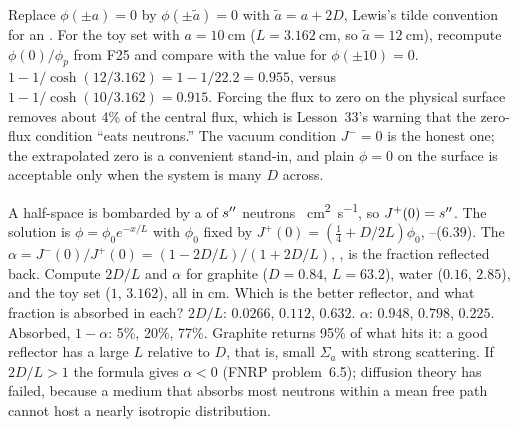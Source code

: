 \documentclass[compact]{ne630handout}
\begin{document}
\begin{programmed}
\begin{pframe}
Replace $\phi(\pm a)=0$ by $\phi(\pm\tilde a)=0$ with $\tilde a=a+2D$, Lewis's tilde convention for an . For the toy set with $a=\SI{10}{\centi\meter}$ ($L=\SI{3.162}{\centi\meter}$, so $\tilde a=\SI{12}{\centi\meter}$), recompute $\phi(0)/\phi_p$ from F25 and compare with the value for $\phi(\pm10)=0$.
\response
$1-1/\cosh(12/3.162)=1-1/22.2=0.955$, versus $1-1/\cosh(10/3.162)=0.915$. Forcing the flux to zero on the physical surface removes about 4\% of the central flux, which is Lesson~33's warning that the zero-flux condition ``eats neutrons.'' The vacuum condition $J^{-}=0$ is the honest one; the extrapolated zero is a convenient stand-in, and plain $\phi=0$ on the surface is acceptable only when the system is many $D$ across.
\end{pframe}

\begin{pframe}


\end{pframe}

\begin{pframe}
A half-space is bombarded by a  of $s''$ neutrons \si{\per\centi\meter\squared\per\second}, so $J^{+}(0)=s''$. The solution is $\phi=\phi_0e^{-x/L}$ with $\phi_0$ fixed by $J^{+}(0)=(\tfrac14+D/2L)\phi_0$, --(6.39). The  $\alpha=J^{-}(0)/J^{+}(0)=(1-2D/L)/(1+2D/L)$, , is the fraction reflected back. Compute $2D/L$ and $\alpha$ for graphite ($D=0.84$, $L=63.2$), water ($0.16$, $2.85$), and the toy set ($1$, $3.162$), all in \si{\centi\meter}. Which is the better reflector, and what fraction is absorbed in each?
\response
$2D/L$: $0.0266$, $0.112$, $0.632$. $\alpha$: $0.948$, $0.798$, $0.225$. Absorbed, $1-\alpha$: 5\%, 20\%, 77\%. Graphite returns 95\% of what hits it: a good reflector has a large $L$ relative to $D$, that is, small $\Sigma_a$ with strong scattering. If $2D/L>1$ the formula gives $\alpha<0$ (FNRP problem~6.5); diffusion theory has failed, because a medium that absorbs most neutrons within a mean free path cannot host a nearly isotropic distribution.
\end{pframe}


\end{programmed}
\end{document}
